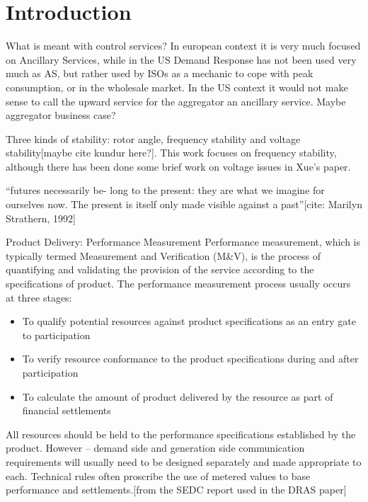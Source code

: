 \chapter{Introduction}
What is meant with control services? In european context it is very much focused on Ancillary Services, while in the US Demand Response has not been used very much as AS, but rather used by ISOs as a mechanic to cope with peak consumption, or in the wholesale market. In the US context it would not make sense to call the upward service for the aggregator an ancillary service. Maybe aggregator business case?

Three kinds of stability: rotor angle, frequency stability and voltage stability[maybe cite kundur here?]. This work focuses on frequency stability, although there has been done some brief work on voltage issues in Xue's paper. 
\cite{adams1980hitchhiker}

``futures necessarily be- long to the present: they are what we imagine for ourselves now. The present is itself only made visible against a past''[cite: Marilyn Strathern, 1992]

Product Delivery: Performance Measurement 
Performance measurement, which is typically termed Measurement and Verification (M\&V), is the process of quantifying and validating the provision of the service according to the specifications of product. The performance measurement process usually occurs at three stages: 
\begin{itemize}
	\item To qualify potential resources against product specifications as an entry gate to participation 
	\item To verify resource conformance to the product specifications during and after participation 
	\item To calculate the amount of product delivered by the resource as part of financial settlements
\end{itemize}
 
All resources should be held to the performance specifications established by the product. However – demand side and generation side communication requirements will usually need to be designed separately and made appropriate to each. Technical rules often proscribe the use of metered values to base performance and settlements.[from the SEDC report used in the DRAS paper]
